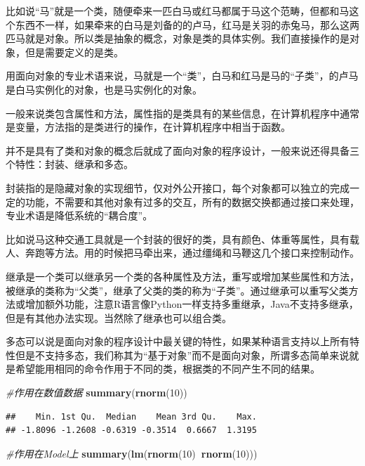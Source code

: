 \documentclass[]{book}
\newenvironment{Shaded}{\begin{snugshade}}{\end{snugshade}}
\newcommand{\KeywordTok}[1]{\textcolor[rgb]{0.13,0.29,0.53}{\textbf{#1}}}
\newcommand{\DecValTok}[1]{\textcolor[rgb]{0.00,0.00,0.81}{#1}}
\newcommand{\CommentTok}[1]{\textcolor[rgb]{0.56,0.35,0.01}{\textit{#1}}}
\newcommand{\OperatorTok}[1]{\textcolor[rgb]{0.81,0.36,0.00}{\textbf{#1}}}
\newcommand{\NormalTok}[1]{#1}
\begin{document}
比如说``马''就是一个类，随便牵来一匹白马或红马都属于马这个范畴，但都和马这个东西不一样，如果牵来的白马是刘备的的卢马，红马是关羽的赤兔马，那么这两匹马就是对象。所以类是抽象的概念，对象是类的具体实例。我们直接操作的是对象，但是需要定义的是类。

用面向对象的专业术语来说，马就是一个``类''，白马和红马是马的``子类''，的卢马是白马实例化的对象，也是马实例化的对象。

一般来说类包含属性和方法，属性指的是类具有的某些信息，在计算机程序中通常是变量，方法指的是类进行的操作，在计算机程序中相当于函数。

并不是具有了类和对象的概念后就成了面向对象的程序设计，一般来说还得具备三个特性：封装、继承和多态。

封装指的是隐藏对象的实现细节，仅对外公开接口，每个对象都可以独立的完成一定的功能，不需要和其他对象有过多的交互，所有的数据交换都通过接口来处理，专业术语是降低系统的``耦合度''。

比如说马这种交通工具就是一个封装的很好的类，具有颜色、体重等属性，具有载人、奔跑等方法。用的时候把马牵出来，通过缰绳和马鞭这几个接口来控制动作。

继承是一个类可以继承另一个类的各种属性及方法，重写或增加某些属性和方法，被继承的类称为``父类''，继承了父类的类的称为``子类''。通过继承可以重写父类方法或增加额外功能，注意R语言像Python一样支持多重继承，Java不支持多继承，但是有其他办法实现。当然除了继承也可以组合类。

多态可以说是面向对象的程序设计中最关键的特性，如果某种语言支持以上所有特性但是不支持多态，我们称其为``基于对象''而不是面向对象，所谓多态简单来说就是希望能用相同的命令作用于不同的类，根据类的不同产生不同的结果。

\begin{Shaded}
\begin{Highlighting}[]
\CommentTok{#作用在数值数据}
\KeywordTok{summary}\NormalTok{(}\KeywordTok{rnorm}\NormalTok{(}\DecValTok{10}\NormalTok{))}
\end{Highlighting}
\end{Shaded}

\begin{verbatim}
##    Min. 1st Qu.  Median    Mean 3rd Qu.    Max. 
## -1.8096 -1.2608 -0.6319 -0.3514  0.6667  1.3195
\end{verbatim}

\begin{Shaded}
\begin{Highlighting}[]
\CommentTok{#作用在Model上}
\KeywordTok{summary}\NormalTok{(}\KeywordTok{lm}\NormalTok{(}\KeywordTok{rnorm}\NormalTok{(}\DecValTok{10}\NormalTok{)}\OperatorTok{~}\KeywordTok{rnorm}\NormalTok{(}\DecValTok{10}\NormalTok{)))}
\end{Highlighting}
\end{Shaded}
\end{document}
